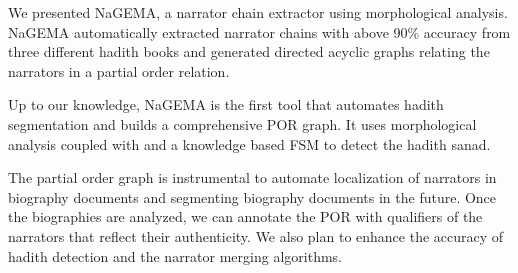 \documentclass{llncs}
\begin{document}
We presented NaGEMA, a narrator chain extractor
using morphological analysis. 
NaGEMA automatically extracted narrator chains with 
above 90\% accuracy
from three different hadith books and generated 
directed acyclic graphs relating the narrators 
in a partial order relation. 

Up to our knowledge, NaGEMA is the first 
tool that automates hadith segmentation and builds
a comprehensive POR graph.
It uses morphological analysis coupled with 
and a knowledge based FSM to  detect the hadith 
sanad. 

The partial order graph is instrumental to automate
localization of narrators in biography documents and
segmenting biography documents in the future.
Once the biographies are analyzed, we can annotate
the POR with qualifiers of the narrators that reflect
their authenticity. 
We also plan to 
enhance the accuracy of hadith detection and the 
narrator merging algorithms. 







\end{document}
